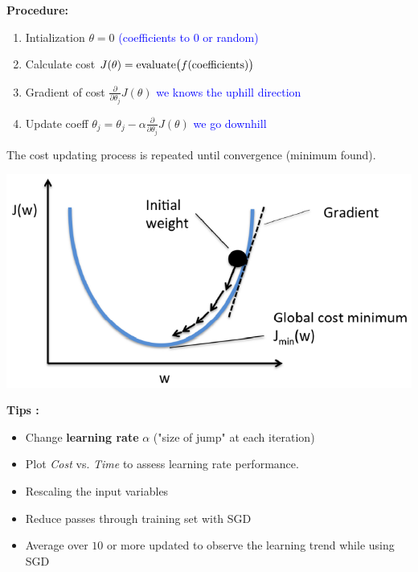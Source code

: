 \documentclass[letterpaper, 10.5pt,landscape]{article}
\begin{document}
\begin{multicols*}{3}
\textbf{Procedure: }
\begin{enumerate}
    \item Intialization  \hspace{14pt} \(\theta = 0\) \textcolor{blue}{(coefficients to 0 or random)}
    \item Calculate cost  \hspace{5pt} \(J(\theta) = \text{evaluate\big($f$(coefficients)}\big)\)
    \item Gradient of cost \hspace{-2pt} $\frac{\partial}{\partial \theta_{j}} J(\theta)$ \textcolor{blue}{we knows the uphill direction} 
    \item Update coeff \hspace{12pt} $\theta_{j} = \theta_{j} - \alpha \frac{\partial}{\partial \theta_{j}} J(\theta)$ \textcolor{blue}{we go downhill}
\end{enumerate}
The cost updating process is repeated until convergence (minimum found). 
\vspace{-7pt}
\begin{center}
    \begin{minipage}{0.75\linewidth}
        \includegraphics[width=\textwidth]{figures/gradient_decent.PNG}
    \end{minipage}    
\end{center}
\vspace{-3pt}

\textbf{Tips : }
\vspace{-5pt}
\begin{itemize}
    \item Change \textbf{learning rate} $\alpha$ ("size of jump" at each iteration)
    \vspace{-3pt}
    \item Plot \textit{Cost} vs. \textit{Time} to assess learning rate performance. 
    \vspace{-3pt}
    \item Rescaling the input variables
    \vspace{-3pt}
    \item Reduce passes through training set with SGD
    \vspace{-3pt}
    \item Average over $10$ or more updated to observe the learning trend while using SGD
    \vspace{-3pt}
\end{itemize}


\end{multicols*}
\end{document}
